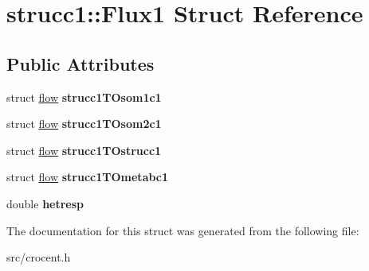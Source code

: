 \hypertarget{structstrucc1_1_1_flux1}{\section{strucc1\-:\-:Flux1 Struct Reference}
\label{structstrucc1_1_1_flux1}
}
\subsection*{Public Attributes}
\begin{DoxyCompactItemize}
\item 
\hypertarget{structstrucc1_1_1_flux1_a24cc99a74751d90dc3944bf41db9c428}{struct \hyperlink{structflow}{flow} {\bfseries strucc1\-T\-Osom1c1}}\label{structstrucc1_1_1_flux1_a24cc99a74751d90dc3944bf41db9c428}

\item 
\hypertarget{structstrucc1_1_1_flux1_afaecb42c19c9485e5e3519cd5d325cc5}{struct \hyperlink{structflow}{flow} {\bfseries strucc1\-T\-Osom2c1}}\label{structstrucc1_1_1_flux1_afaecb42c19c9485e5e3519cd5d325cc5}

\item 
\hypertarget{structstrucc1_1_1_flux1_a35ce7d2e7fbc7a76a8778e46bdd8ce9d}{struct \hyperlink{structflow}{flow} {\bfseries strucc1\-T\-Ostrucc1}}\label{structstrucc1_1_1_flux1_a35ce7d2e7fbc7a76a8778e46bdd8ce9d}

\item 
\hypertarget{structstrucc1_1_1_flux1_aa01bb952839dc6ec8247f7d277beae70}{struct \hyperlink{structflow}{flow} {\bfseries strucc1\-T\-Ometabc1}}\label{structstrucc1_1_1_flux1_aa01bb952839dc6ec8247f7d277beae70}

\item 
\hypertarget{structstrucc1_1_1_flux1_ada1db1a0ee16b0b8cb43325e856c50e8}{double {\bfseries hetresp}}\label{structstrucc1_1_1_flux1_ada1db1a0ee16b0b8cb43325e856c50e8}

\end{DoxyCompactItemize}


The documentation for this struct was generated from the following file\-:\begin{DoxyCompactItemize}
\item 
src/crocent.\-h\end{DoxyCompactItemize}
